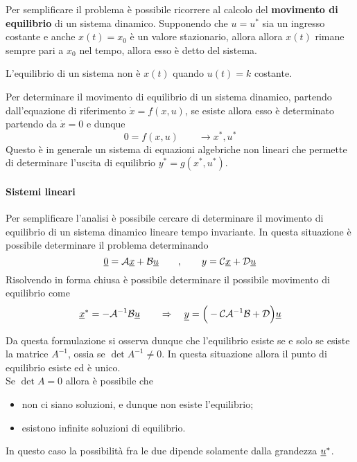  	Per semplificare il problema è possibile ricorrere al calcolo del \textbf{movimento di equilibrio} di un sistema dinamico. Supponendo che $u=u^*$ sia un ingresso costante e anche $x(t)=x_0$ è un valore stazionario, allora allora $x(t)$ rimane sempre pari a $x_0$ nel tempo, allora esso  è detto  del sistema.
 	
 	\begin{nota}
 		L'equilibrio di un sistema non è $x(t)$ quando $u(t)=k$ costante.
 	\end{nota}
 	Per determinare il movimento di equilibrio di un sistema dinamico, partendo dall'equazione di riferimento $\dot x=f(x,u)$, se esiste allora esso è determinato partendo da $\dot x=0$ e dunque
 	\[ 0 = f(x,u) \qquad \rightarrow x^*,u^*  \]
 	Questo è in generale un sistema di equazioni algebriche non lineari che permette di determinare l'uscita di equilibrio $y^* = g(x^*, u^*)$.
 	
 	\paragraph{Sistemi lineari} Per semplificare l'analisi è possibile cercare di determinare il movimento di equilibrio di un sistema dinamico lineare tempo invariante. In questa situazione è possibile determinare il problema determinando
 	\[ \underline{0} = \mathcal A \underline{x} + \mathcal B \underline{u} \qquad ,\qquad y = \mathcal C \underline{x} + \mathcal D \underline{u}  \]
 	Risolvendo in forma chiusa è possibile determinare il possibile movimento di equilibrio come
 	\[\underline{x}^* = -\mathcal A ^{-1} \mathcal B \underline{u}  \qquad \Rightarrow \quad \underline{y} = \Big(-\mathcal C \mathcal A^{-1} \mathcal B+ \mathcal D\Big) \underline{u} \]
 	 	
 	Da questa formulazione si osserva dunque che l'equilibrio esiste se e solo se esiste la matrice $A^{-1}$, ossia se $\det A^{-1} \neq 0$. In questa situazione allora il punto di equilibrio esiste ed è unico.  \\
 	Se $\det A = 0$ allora è possibile che
 	\begin{itemize}
 		\item non ci siano soluzioni, e dunque non esiste l'equilibrio;
 		\item esistono infinite soluzioni di equilibrio.
 	\end{itemize}
 	In questo caso la possibilità fra le due dipende solamente dalla grandezza $\underline{u} ^*$.
 	
